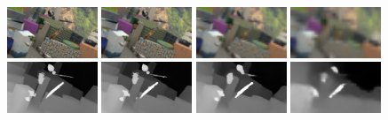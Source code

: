 \documentclass[runningheads]{llncs}
\begin{document}
\begin{figure}[t]
    \begin{center}
        \includegraphics[width=0.24\textwidth,clip]{figures/imL_0.png}
        \includegraphics[width=0.24\textwidth,clip]{figures/imL_1.png}
        \includegraphics[width=0.24\textwidth,clip]{figures/imL_2.png}
        \includegraphics[width=0.24\textwidth,clip]{figures/imL_3.png}
        \\
        \includegraphics[width=0.24\textwidth,clip]{figures/pred_comb_0.png}
        \includegraphics[width=0.24\textwidth,clip]{figures/pred_comb_1.png}
        \includegraphics[width=0.24\textwidth,clip]{figures/pred_comb_2.png}
        \includegraphics[width=0.24\textwidth,clip]{figures/pred_comb_3.png}

\end{center}
\end{figure}
\end{document}
